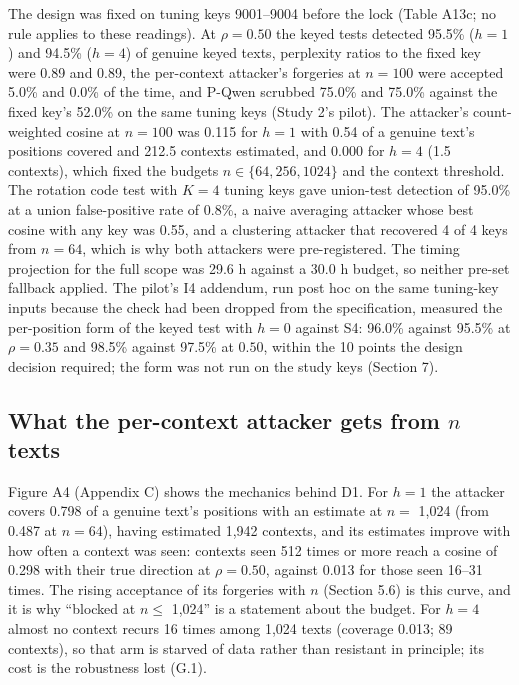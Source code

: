 \documentclass[11pt,letterpaper]{article}
\begin{document}
The design was fixed on tuning keys 9001--9004 before the lock (Table A13c; no rule applies to these readings). At \(\rho = 0.50\) the keyed tests detected 95.5\% (\(h = 1\)) and 94.5\% (\(h = 4\)) of genuine keyed texts, perplexity ratios to the fixed key were 0.89 and 0.89, the per-context attacker's forgeries at \(n = 100\) were accepted 5.0\% and 0.0\% of the time, and P-Qwen scrubbed 75.0\% and 75.0\% against the fixed key's 52.0\% on the same tuning keys (Study 2's pilot). The attacker's count-weighted cosine at \(n = 100\) was 0.115 for \(h = 1\) with 0.54 of a genuine text's positions covered and 212.5 contexts estimated, and 0.000 for \(h = 4\) (1.5 contexts), which fixed the budgets \(n \in \{64, 256, 1024\}\) and the context threshold. The rotation code test with \(K = 4\) tuning keys gave union-test detection of 95.0\% at a union false-positive rate of 0.8\%, a naive averaging attacker whose best cosine with any key was 0.55, and a clustering attacker that recovered 4 of 4 keys from \(n = 64\), which is why both attackers were pre-registered. The timing projection for the full scope was 29.6 h against a 30.0 h budget, so neither pre-set fallback applied. The pilot's I4 addendum, run post hoc on the same tuning-key inputs because the check had been dropped from the specification, measured the per-position form of the keyed test with \(h = 0\) against S4: 96.0\% against 95.5\% at \(\rho = 0.35\) and 98.5\% against 97.5\% at \(0.50\), within the 10 points the design decision required; the form was not run on the study keys (Section 7).

\hypertarget{what-the-per-context-attacker-gets-from-n-texts}{%
\subsection{\texorpdfstring{What the per-context attacker gets from \(n\) texts}{What the per-context attacker gets from n texts}}\label{what-the-per-context-attacker-gets-from-n-texts}}

Figure A4 (Appendix C) shows the mechanics behind D1. For \(h = 1\) the attacker covers 0.798 of a genuine text's positions with an estimate at \(n =\) 1,024 (from 0.487 at \(n = 64\)), having estimated 1,942 contexts, and its estimates improve with how often a context was seen: contexts seen 512 times or more reach a cosine of 0.298 with their true direction at \(\rho = 0.50\), against 0.013 for those seen 16--31 times. The rising acceptance of its forgeries with \(n\) (Section 5.6) is this curve, and it is why ``blocked at \(n \leq\) 1,024'' is a statement about the budget. For \(h = 4\) almost no context recurs 16 times among 1,024 texts (coverage 0.013; 89 contexts), so that arm is starved of data rather than resistant in principle; its cost is the robustness lost (G.1).
\end{document}
